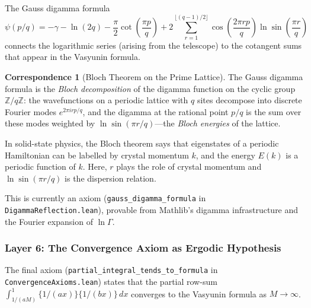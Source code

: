 \documentclass[11pt,a4paper]{article}
\theoremstyle{definition}
\newtheorem{correspondence}[definition]{Correspondence}
\newcommand{\ZZ}{\mathbb{Z}}
\newcommand{\fract}[1]{\{#1\}}
\newcommand{\lean}[1]{\texttt{#1}}
\begin{document}
The Gauss digamma formula
\[
  \psi(p/q) = -\gamma - \ln(2q) - \frac{\pi}{2}\cot\left(\frac{\pi p}{q}\right)
  + 2\sum_{r=1}^{\lfloor(q-1)/2\rfloor} \cos\left(\frac{2\pi rp}{q}\right)
  \ln\sin\left(\frac{\pi r}{q}\right)
\]
connects the logarithmic series (arising from the telescope) to the
cotangent sums that appear in the Vasyunin formula.

\begin{correspondence}[Bloch Theorem on the Prime Lattice]
The Gauss digamma formula is the \emph{Bloch decomposition} of the
digamma function on the cyclic group $\ZZ/q\ZZ$: the wavefunctions on
a periodic lattice with $q$ sites decompose into discrete Fourier
modes $e^{2\pi irp/q}$, and the digamma at the rational point $p/q$
is the sum over these modes weighted by $\ln\sin(\pi r/q)$---the
\emph{Bloch energies} of the lattice.

In solid-state physics, the Bloch theorem says that eigenstates of
a periodic Hamiltonian can be labelled by crystal momentum $k$,
and the energy $E(k)$ is a periodic function of $k$. Here,
$r$ plays the role of crystal momentum and $\ln\sin(\pi r/q)$
is the dispersion relation.

This is currently an axiom (\lean{gauss\_digamma\_formula} in
\lean{DigammaReflection.lean}), provable from Mathlib's digamma
infrastructure and the Fourier expansion of $\ln\Gamma$.
\end{correspondence}

\subsubsection{Layer 6: The Convergence Axiom as Ergodic Hypothesis}

The final axiom (\lean{partial\_integral\_tends\_to\_formula} in
\lean{ConvergenceAxioms.lean}) states that the partial row-sum
$\int_{1/(aM)}^1 \fract{1/(ax)}\fract{1/(bx)}\,dx$ converges
to the Vasyunin formula as $M \to \infty$.
\end{document}
